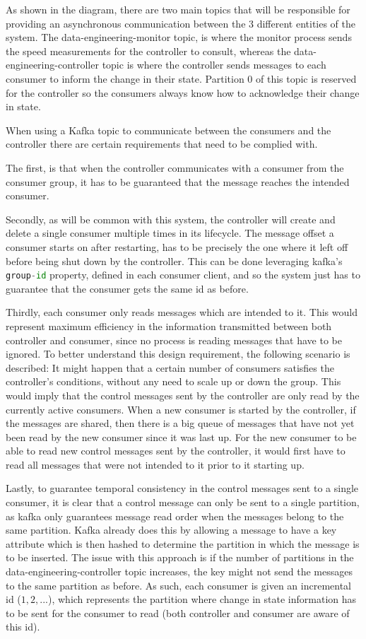 As shown in the diagram, there are two main topics that will be responsible for
providing an asynchronous communication between the 3 different entities of the
system. The data-engineering-monitor topic, is where the monitor process sends
the speed measurements for the controller to consult, whereas the
data-engineering-controller topic is where the controller sends messages to each
consumer to inform the change in their state. Partition 0 of this topic is
reserved for the controller so the consumers always know how to acknowledge
their change in state.

When using a Kafka topic to communicate between the consumers and the controller
there are certain requirements that need to be complied with. 

The first, is that when the controller communicates with a consumer from the
consumer group, it has to be guaranteed that the message reaches the intended
consumer. 

Secondly, as will be common with this system, the controller will create and
delete a single consumer multiple times in its lifecycle. The message offset a
consumer starts on after restarting, has to be precisely the one where it left
off before being shut down by the controller. This can be done leveraging
kafka's \lstinline[language=Python]{group-id} property, defined in each consumer
client, and so the system just has to guarantee that the consumer gets the same
id as before.

Thirdly, each consumer only reads messages which are intended to it. This would
represent maximum efficiency in the information transmitted between both
controller and consumer, since no process is reading messages that have to be
ignored. To better understand this design requirement, the following scenario is
described: It might happen that a certain number of consumers satisfies the
controller's conditions, without any need to scale up or down the group. This
would imply that the control messages sent by the controller are only read by
the currently active consumers. When a new consumer is started by the
controller, if the messages are shared, then there is a big queue of messages
that have not yet been read by the new consumer since it was last up. For the
new consumer to be able to read new control messages sent by the controller, it
would first have to read all messages that were not intended to it prior to it
starting up.

Lastly, to guarantee temporal consistency in the control messages sent to a
single consumer, it is clear that a control message can only be sent to a single
partition, as kafka only guarantees message read order when the messages belong
to the same partition. Kafka already does this by allowing a message to have a
key attribute which is then hashed to determine the partition in which the
message is to be inserted. The issue with this approach is if the number of
partitions in the data-engineering-controller topic increases, the key might not
send the messages to the same partition as before. As such, each consumer is
given an incremental id ($1, 2, ...$), which represents the partition where
change in state information has to be sent for the consumer to read (both
controller and consumer are aware of this id).

